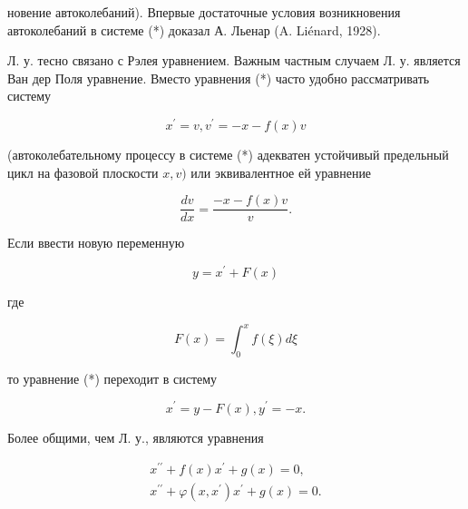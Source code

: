 \documentclass[10pt]{article}
\begin{document}
новение автоколебаний). Впервые достаточные условия возникновения автоколебаний в системе (*) доказал А. Льенар (A. Liénard, 1928).



Л. у. тесно связано с Рэлея уравнением. Важным частным случаем Л. у. является Ван дер Поля уравнение. Вместо уравнения (*) часто удобно рассматривать систему



\[

x^{\prime}=v, v^{\prime}=-x-f(x) v

\]



(автоколебательному процессу в системе (*) адекватен устойчивый предельный цикл на фазовой плоскости $x, v)$ или эквивалентное ей уравнение



\[

\frac{d v}{d x}=\frac{-x-f(x) v}{v} .

\]



Если ввести новую переменную



\[

y=x^{\prime}+F(x)

\]



где



\[

F(x)=\int_{0}^{x} f(\xi) d \xi

\]



то уравнение (*) переходит в систему



\[

x^{\prime}=y-F(x), y^{\prime}=-x .

\]



Более общими, чем Л. у., являются уравнения



\[

\begin{gathered}

x^{\prime \prime}+f(x) x^{\prime}+g(x)=0, \\

x^{\prime \prime}+\varphi\left(x, x^{\prime}\right) x^{\prime}+g(x)=0 .

\end{gathered}

\]
\end{document}
